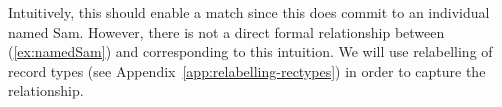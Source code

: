 Intuitively, this should enable a match since this does commit to an
individual named Sam.  However, there is not a direct formal
relationship between (\ref{ex:namedSam}) and \preveg{} corresponding
to this intuition. We will use relabelling of record
types (see Appendix~\ref{app:relabelling-rectypes}) in order to
capture the relationship.  
